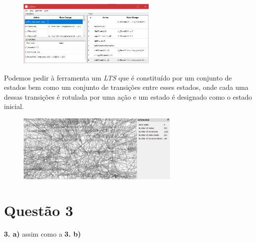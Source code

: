 \documentclass[11pt,a4paper]{report}
\begin{document}
\begin{figure} [h]
        \centering
		\includegraphics[width=0.60\textwidth]{Ex21.jpeg}\par\vspace{1cm}
\end{figure}
Podemos pedir à ferramenta um \emph{LTS} que é constituído por um conjunto de estados bem como um conjunto de transições entre esses estados, onde cada uma dessas transições é rotulada por uma ação e um estado é designado como o estado inicial.

\begin{figure} [h]
        \centering
		\includegraphics[width=0.70\textwidth]{Ex22.jpeg}\par\vspace{1cm}
\end{figure}

\section{Questão 3}

\textbf{3. a)} assim como a \textbf{3. b)}
\end{document}
